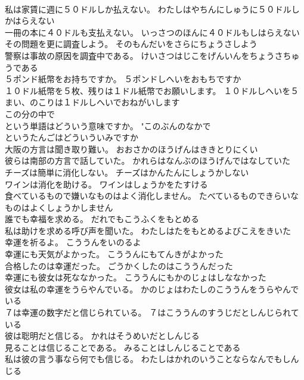 \documentclass[8pt]{extreport}
\begin{document}
\begin{CJK}{UTF8}{min}
\\	私は家賃に週に５０ドルしか払えない。	わたしはやちんにしゅうに５０ドルしかはらえない 
\\	一冊の本に４０ドルも支払えない。	いっさつのほんに４０ドルもしはらえない 
\\	その問題を更に調査しよう。	そのもんだいをさらにちょうさしよう 
\\	警察は事故の原因を調査中である。	けいさつはじこをげんいんをちょうさちゅうである 
\\	５ポンド紙幣をお持ちですか。	５ポンドしへいをおもちですか 
\\	１０ドル紙幣を５枚、残りは１ドル紙幣でお願いします。	１０ドルしへいを５まい、のこりは１ドルしへいでおねがいします 
\\	この分の中で
\\	という単語はどういう意味ですか。	"このぶんのなかで
\\	というたんごはどういういみですか 
\\	大阪の方言は聞き取り難い。	おおさかのほうげんはききとりにくい 
\\	彼らは南部の方言で話していた。	かれらはなんぶのほうげんではなしていた 
\\	チーズは簡単に消化しない。	チーズはかんたんにしょうかしない 
\\	ワインは消化を助ける。	ワインはしょうかをたすける 
\\	食べているもので嫌いなものはよく消化しません。	たべているものできらいなものはよくしょうかしません 
\\	誰でも幸福を求める。	だれでもこうふくをもとめる 
\\	私は助けを求める呼び声を聞いた。	わたしはたをもとめるよびこえをきいた 
\\	幸運を祈るよ。	こううんをいのるよ 
\\	幸運にも天気がよかった。	こううんにもてんきがよかった 
\\	合格したのは幸運だった。	ごうかくしたのはこううんだった 
\\	幸運にも彼女は死ななかった。	こううんにもかのじょはしななかった 
\\	彼女は私の幸運をうらやんでいる。	かのじょはわたしのこううんをうらやんでいる 
\\	７は幸運の数字だと信じられている。	７はこううんのすうじだとしんじられている 
\\	彼は聡明だと信じる。	かれはそうめいだとしんじる 
\\	見ることは信じることである。	みることはしんじることである 
\\	私は彼の言う事なら何でも信じる。	わたしはかれのいうことならなんでもしんじる 

\end{CJK}
\end{document}
